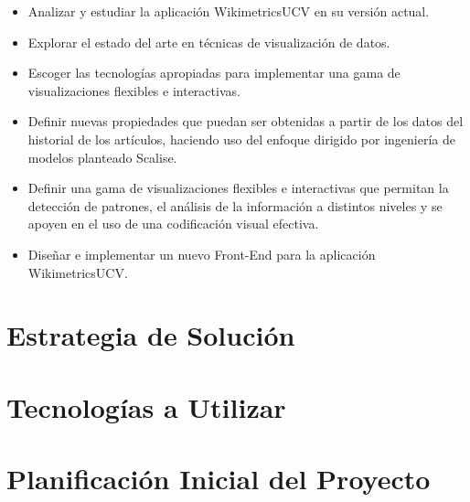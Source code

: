 \begin{itemize}
  \item Analizar y estudiar la aplicación WikimetricsUCV en su versión actual.
  \item Explorar el estado del arte en técnicas de visualización de datos.
  \item Escoger las tecnologías apropiadas para implementar una gama de visualizaciones flexibles e interactivas.
  \item Definir nuevas propiedades que puedan ser obtenidas a partir de los datos del historial de los artículos, haciendo uso del enfoque dirigido por ingeniería de modelos planteado Scalise.
  \item Definir una gama de visualizaciones flexibles e interactivas que permitan la detección de patrones, el análisis de la información a distintos niveles y se apoyen en el uso de una codificación visual efectiva.
  \item Diseñar e implementar un nuevo Front-End para la aplicación WikimetricsUCV.
\end{itemize}

\section{Estrategia de Solución}

\section{Tecnologías a Utilizar}

\section{Planificación Inicial del Proyecto}
